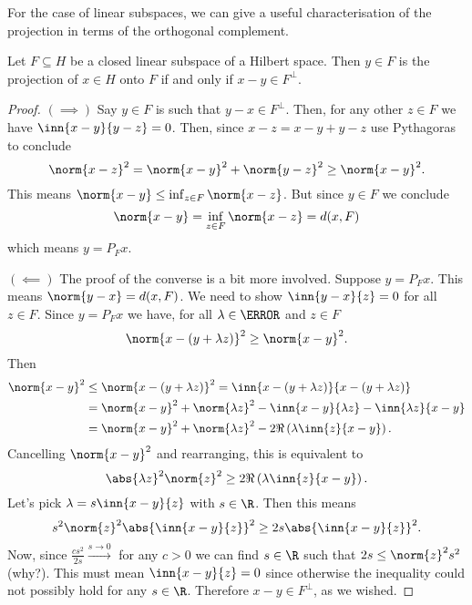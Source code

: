\documentclass[12pt,oneside]{book}
\begin{document}
For the case of linear subspaces, we can give a useful characterisation of the projection
in terms of the orthogonal complement.
\begin{proposition}
	Let \( F \subseteq H \) be a closed linear subspace of a Hilbert space. Then \( y \in F
	\) is the projection of \( x \in H \) onto \( F \) if and only if \( x - y \in F^\perp
	\).
\end{proposition}
\begin{proof}
	\( (\implies) \) Say \( y \in F \) is such that \( y - x \in F^\perp \). Then, for any
	other \( z \in F \) we have \( \inn{x - y}{y - z} = 0 \). Then, since \( x - z = x-y +
	y-z \) use Pythagoras to conclude
	\begin{equation*}
		\norm{x - z}^2 = \norm{x-y}^2 + \norm{y-z}^2 \geq \norm{x-y}^2.
	\end{equation*}
	This means \( \norm{x-y} \leq \inf_{z \in F} \norm{x - z} \). But since \( y \in F \) we
	conclude
	\begin{equation*}
		\norm{x-y} = \inf_{z \in F}\norm{x-z} = d(x,F)
	\end{equation*}
	which means \( y = P_Fx \).

	\( (\impliedby) \) The proof of the converse is a bit more involved. Suppose \( y =
	P_Fx \). This means \( \norm{y-x} = d(x,F) \). We need to show \( \inn{y-x}{z} = 0 \)
	for all \( z \in F \). Since \( y = P_F x \) we have, for all \( \lambda \in \C \) and
	\( z \in F \)
	\begin{equation*}
		\norm{x - (y+\lambda z)}^2 \geq \norm{x-y}^2.
	\end{equation*}
	Then
	\begin{align*}
		\norm{x-y}^2 & \leq \norm{x-(y + \lambda z)}^2 = \inn{x-(y + \lambda z)}{x-(y +
		\lambda z)} \\
								 & = \norm{x-y}^2 + \norm{\lambda z}^2 - \inn{x-y}{\lambda z} -
								 \inn{\lambda z}{x-y} \\
								 & = \norm{x-y}^2 + \norm{\lambda z}^2 - 2 \Re\left(\lambda
								 \inn{z}{x-y}\right).
	\end{align*}
	Cancelling \( \norm{x-y}^2 \) and rearranging, this is equivalent to
	\begin{equation*}
		\abs{\lambda z}^2 \norm{z}^2 \geq 2\Re\left(\lambda \inn{z}{x-y}\right).
	\end{equation*}
	Let's pick \( \lambda = s \inn{x-y}{z} \) with \( s \in \R \). Then this means
	\begin{equation*}
		s^2 \norm{z}^2 \abs{\inn{x-y}{z}}^2 \geq 2s\abs{\inn{x-y}{z}}^2.
	\end{equation*}
	Now, since \( \frac{cs^2}{2s} \xrightarrow{s \to 0} \) for any \( c > 0 \) we can find
	\( s \in \R \) such that \( 2s \leq \norm{z}^2s^2 \) (why?). This must mean \(
	\inn{x-y}{z} = 0 \) since otherwise the inequality could not possibly hold for any \( s
	\in \R \). Therefore \( x-y \in F^\perp \), as we wished.
\end{proof}
\end{document}

